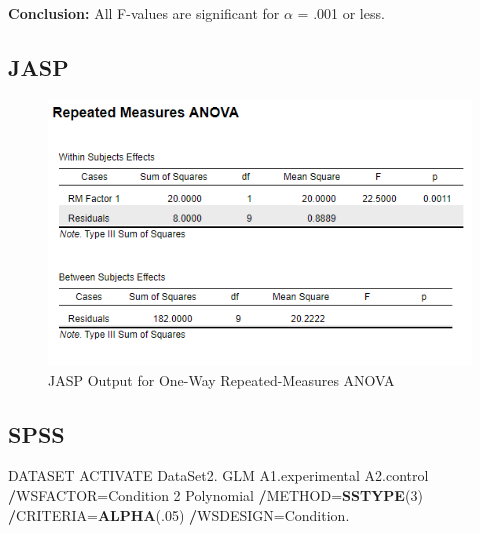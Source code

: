 \documentclass[
]{book}
\newenvironment{Shaded}{\begin{snugshade}}{\end{snugshade}}
\newcommand{\DecValTok}[1]{\textcolor[rgb]{0.00,0.00,0.81}{#1}}
\newcommand{\KeywordTok}[1]{\textcolor[rgb]{0.13,0.29,0.53}{\textbf{#1}}}
\newcommand{\NormalTok}[1]{#1}
\newcommand{\OperatorTok}[1]{\textcolor[rgb]{0.81,0.36,0.00}{\textbf{#1}}}
\begin{document}
\textbf{Conclusion:} All F-values are significant for \(\alpha\) = .001 or less.

\hypertarget{jasp-3}{%
\subsection{JASP}\label{jasp-3}}

\begin{figure}[!h]
\includegraphics{Screenshots/Repeated Measures ANOVA/ranovaJASP} \caption{\label{fig:ranovaJASP}JASP Output for One-Way Repeated-Measures ANOVA}\label{fig:ranovaJASP}
\end{figure}

\hypertarget{spss-3}{%
\subsection{SPSS}\label{spss-3}}

\begin{Shaded}
\begin{Highlighting}[]
\NormalTok{DATASET ACTIVATE DataSet2.}
\NormalTok{GLM A1.experimental A2.control}
  \OperatorTok{/}\NormalTok{WSFACTOR=Condition }\DecValTok{2}\NormalTok{ Polynomial }
  \OperatorTok{/}\NormalTok{METHOD=}\KeywordTok{SSTYPE}\NormalTok{(}\DecValTok{3}\NormalTok{)}
  \OperatorTok{/}\NormalTok{CRITERIA=}\KeywordTok{ALPHA}\NormalTok{(.}\DecValTok{05}\NormalTok{)}
  \OperatorTok{/}\NormalTok{WSDESIGN=Condition.}
\end{Highlighting}
\end{Shaded}
\end{document}
